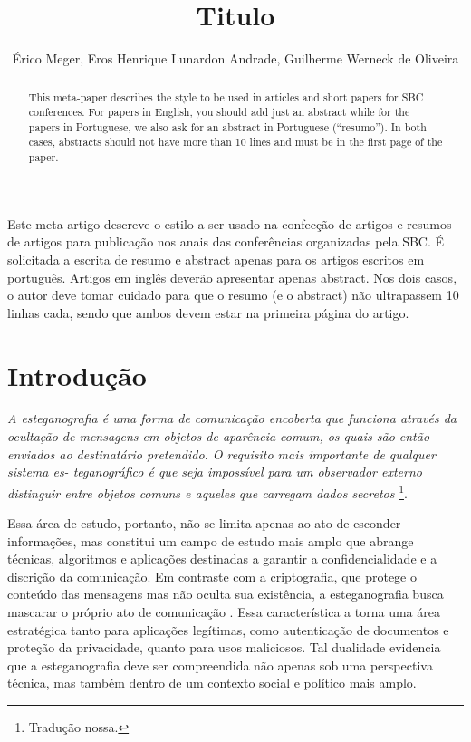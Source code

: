 \documentclass[12pt]{article}
\title{Titulo}
\author{Érico Meger\inst{1}, Eros Henrique Lunardon Andrade\inst{1}, Guilherme Werneck de Oliveira\inst{1}}
\begin{document}
\maketitle

\begin{abstract}
  This meta-paper describes the style to be used in articles and short papers
  for SBC conferences. For papers in English, you should add just an abstract
  while for the papers in Portuguese, we also ask for an abstract in
  Portuguese (``resumo''). In both cases, abstracts should not have more than
  10 lines and must be in the first page of the paper.
\end{abstract}

\begin{resumo}
  Este meta-artigo descreve o estilo a ser usado na confecção de artigos e
  resumos de artigos para publicação nos anais das conferências organizadas
  pela SBC. É solicitada a escrita de resumo e abstract apenas para os artigos
  escritos em português. Artigos em inglês deverão apresentar apenas abstract.
  Nos dois casos, o autor deve tomar cuidado para que o resumo (e o abstract)
  não ultrapassem 10 linhas cada, sendo que ambos devem estar na primeira
  página do artigo.
\end{resumo}

\section{Introdução}

\textit{A esteganografia é uma forma de comunicação encoberta que funciona através da ocultação de mensagens em objetos de aparência comum,
  os quais são então enviados ao destinatário pretendido. O requisito mais importante de qualquer sistema es-
  teganográfico é que seja impossível para um observador externo distinguir entre objetos comuns e aqueles que carregam dados secretos} \cite{Fridrich2010}\footnote{Tradução nossa.}.

Essa área de estudo, portanto, não se limita apenas ao ato de esconder
informações, mas constitui um campo de estudo mais amplo que abrange técnicas,
algoritmos e aplicações destinadas a garantir a confidencialidade e a discrição
da comunicação. Em contraste com a criptografia, que protege o conteúdo das
mensagens mas não oculta sua existência, a esteganografia busca mascarar o
próprio ato de comunicação \cite{Fridrich2010}. Essa característica a torna
uma área estratégica tanto para aplicações legítimas, como autenticação de
documentos e proteção da privacidade, quanto para usos maliciosos. Tal dualidade
evidencia que a esteganografia deve ser compreendida não apenas sob uma perspectiva
técnica, mas também dentro de um contexto social e político mais amplo.
\end{document}

